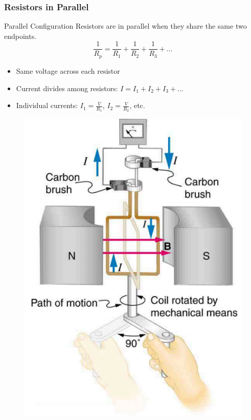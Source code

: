 \documentclass{beamer}
\begin{document}
\begin{frame}
    \frametitle{Resistors in Parallel}
    \begin{block}{Parallel Configuration}
        Resistors are in parallel when they share the same two endpoints.
        \[ \frac{1}{R_p} = \frac{1}{R_1} + \frac{1}{R_2} + \frac{1}{R_3} + \ldots \]
    \end{block}
    \begin{itemize}
        \item Same voltage across each resistor
        \item Current divides among resistors: $I = I_1 + I_2 + I_3 + \ldots$
        \item Individual currents: $I_1 = \frac{V}{R_1}$, $I_2 = \frac{V}{R_2}$, etc.
    \end{itemize}
    \begin{center}
        \begin{figure}
            \centering
            \includegraphics[width=0.5\linewidth]{image.png}
        \end{figure}
    \end{center}
\end{frame}
\end{document}
